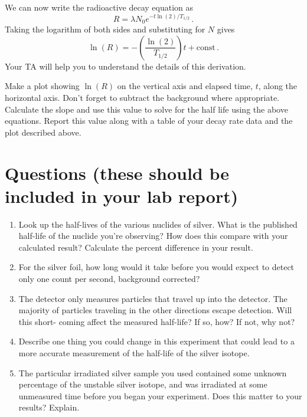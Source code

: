 We can now write the radioactive decay equation as
\begin{equation}
 R = \lambda N_0 e^{-t \ln(2) / T_{1/2}} \,.
\end{equation}
Taking the logarithm of both sides and substituting for $N$ gives
\begin{equation}
 \ln(R) = - \left(\frac{\ln(2)}{T_{1/2}} \right) t + \mathrm{const} \,.
\end{equation}
Your TA will help you to understand the details of this derivation.

Make a plot showing $\ln(R)$ on the vertical axis and elapsed time, $t$, along the horizontal
axis. Don’t forget to subtract the background where appropriate. Calculate the slope
and use this value to solve for the half life using the above equations. Report this value
along with a table of your decay rate data and the plot described above.

\section{Questions (these should be included in your lab report)}

\begin{enumerate}
	\item Look up the half-lives of the various nuclides of silver. What is the published
	half-life of the nuclide you’re observing? How does this compare with your
	calculated result? Calculate the percent difference in your result.
	
	\item For the silver foil, how long would it take before you would expect to detect only
	one count per second, background corrected?
	
	\item The detector only measures particles that travel up into the detector. The majority
	of particles traveling in the other directions escape detection. Will this short-
	coming affect the measured half-life? If so, how? If not, why not?
	
	\item Describe one thing you could change in this experiment that could lead to a more
	accurate measurement of the half-life of the silver isotope.
	
	\item The particular irradiated silver sample you used contained some unknown
	percentage of the unstable silver isotope, and was irradiated at some unmeasured
	time before you began your experiment. Does this matter to your results? Explain.
	
\end{enumerate}